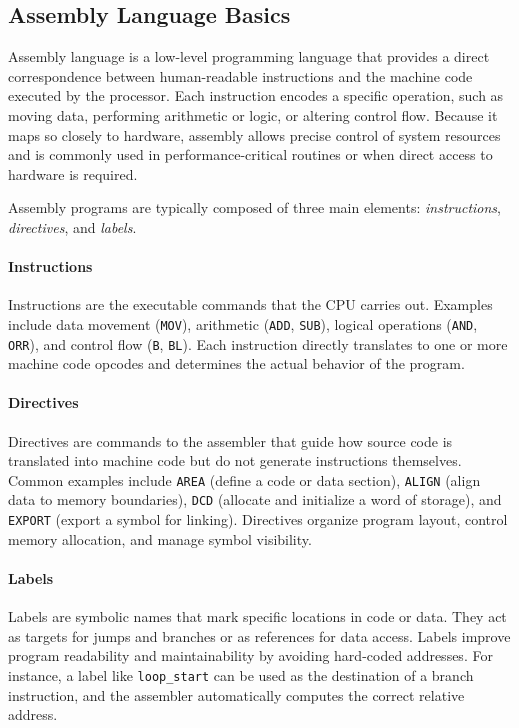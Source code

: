 \subsection{Assembly Language Basics}

Assembly language is a low-level programming language that provides a direct correspondence between human-readable instructions and the machine code executed by the processor. Each instruction encodes a specific operation, such as moving data, performing arithmetic or logic, or altering control flow. Because it maps so closely to hardware, assembly allows precise control of system resources and is commonly used in performance-critical routines or when direct access to hardware is required.

Assembly programs are typically composed of three main elements: \emph{instructions}, \emph{directives}, and \emph{labels}.

\paragraph{Instructions}  
Instructions are the executable commands that the CPU carries out. Examples include data movement (\texttt{MOV}), arithmetic (\texttt{ADD}, \texttt{SUB}), logical operations (\texttt{AND}, \texttt{ORR}), and control flow (\texttt{B}, \texttt{BL}). Each instruction directly translates to one or more machine code opcodes and determines the actual behavior of the program.

\paragraph{Directives}  
Directives are commands to the assembler that guide how source code is translated into machine code but do not generate instructions themselves. Common examples include \texttt{AREA} (define a code or data section), \texttt{ALIGN} (align data to memory boundaries), \texttt{DCD} (allocate and initialize a word of storage), and \texttt{EXPORT} (export a symbol for linking). Directives organize program layout, control memory allocation, and manage symbol visibility.

\paragraph{Labels}  
Labels are symbolic names that mark specific locations in code or data. They act as targets for jumps and branches or as references for data access. Labels improve program readability and maintainability by avoiding hard-coded addresses. For instance, a label like \texttt{loop\_start} can be used as the destination of a branch instruction, and the assembler automatically computes the correct relative address.
